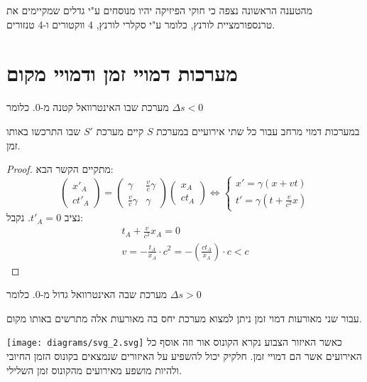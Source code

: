 \documentclass{tstextbook}
\begin{document}
\begin{proposition}
מהטענה הראשונה נצפה כי חוקי הפיזיקה יהיו מנוסחים ע"י גדלים שמקיימים את טרנספורמציית לורנץ, כלומר ע"י סקלרי לורנץ, 4 ווקטורים ו-4 טנזורים.

\end{proposition}
\section{מערכות דמויי זמן ודמויי מקום}

\begin{definition}
מערכת שבו האינטרוואל קטנה מ-0. כלומר \(\Delta s<0\)

\end{definition}
\begin{proposition}
במערכות דמוי מרחב עבור כל שתי אירועיים במערכת \(S\) קיים מערכת \(S'\) שבו התרכשו באותו זמן.

\end{proposition}
\begin{proof}
מתקיים הקשר הבא:
$$\begin{pmatrix}x'_{A} \\ct'_{A} \end{pmatrix}=\begin{pmatrix}\gamma & \frac{v}{c}\gamma \\\frac{v}{c}\gamma & \gamma\end{pmatrix}\begin{pmatrix}x_{A}  \\ct_{A}\end{pmatrix}\iff \begin{cases}x'=\gamma(x+vt) \\t'=\gamma\left( t+\frac{v}{c^2}x \right)
\end{cases}$$
נציב \(t'_{A}=0\). נקבל:
\begin{gather*}t_{A}+\frac{v}{c^2}x_{A}=0 \\v=-\frac{t_{A}}{x_{A}}\cdot c^2 = - \left( \frac{ct_{A}}{x_{A}} \right)\cdot c <c
\end{gather*}

\end{proof}
\begin{definition}
מערכת שבה האינטרוואל גדול מ-0. כלומר \(\Delta s>0\)

\end{definition}
\begin{proposition}
עבור שני מאורעות דמוי זמן ניתן למצוא מערכת יחס בה מאורעות אלה מתרשים באותו מקום. 

\end{proposition}
\texttt{[image: diagrams/svg\_2.svg]}
כאשר האיזור הצבוע נקרא הקונוס אור וזה אוסף כל האירועים אשר הם דמויי זמן. חלקיק יכול להשפיע על האיזורים שנמצאים בקונוס הזמן החיובי ולהיות מושפע מאירועים מהקונוס זמן השלילי.
\end{document}
